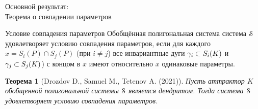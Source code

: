 \documentclass[aspectratio=1610, 10pt, notheorems]{beamer}
\newtheorem{theorem}     {Теорема}
\newtheorem{lemma}       {Лемма}
\begin{document}
%
%



\begin{frame}{Основной результат:\\Теорема о совпадении параметров}
\begin{block}{Условие совпадения параметров}
Обобщённая полигональная система система ${\EuScript S}$ удовлетворяет условию совпадения параметров, если для каждого $x=S_i(P)\cap S_j(P)$ (при $i\neq j$) все инвариантные дуги $\gamma_i\subset S_i(K)$ и $\gamma_j\subset S_j(K)$) с концом в $x$ имеют относительно $x$ одинаковые параметры.
\end{block}
\begin{theorem}[Drozdov D., Samuel M., Tetenov A. (2021)]
Пусть аттрактор $K$ обобщенной полигональной системы ${\EuScript S}$ является дендритом. 
Тогда система ${\EuScript S}$ удовлетворяет условию совпадения параметров.
\end{theorem}
\end{frame}
\end{document}
